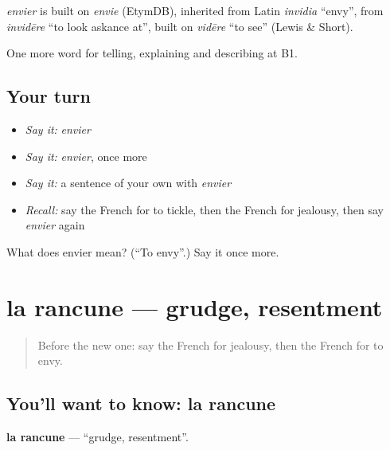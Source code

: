 \begin{cousinweb}
\emph{envier} is built on \emph{envie} (EtymDB), inherited from Latin \emph{invidia} \textquotedblleft{}envy\textquotedblright{}, from \emph{invidēre} \textquotedblleft{}to look askance at\textquotedblright{}, built on \emph{vidēre} \textquotedblleft{}to see\textquotedblright{} (Lewis \& Short).
\end{cousinweb}

\begin{grammarlens}[title={What you've built}]
One more word for telling, explaining and describing at B1.
\end{grammarlens}

\subsection*{Your turn}
\begin{itemize}
\raggedright
  \item \emph{Say it:} \emph{envier}
  \item \emph{Say it:} \emph{envier}, once more
  \item \emph{Say it:} a sentence of your own with \emph{envier}
  \item \emph{Recall:} say the French for to tickle, then the French for jealousy, then say \emph{envier} again
\end{itemize}

\begin{tcolorbox}[breakable,colback=teal!4,colframe=teal!35!black,title={Before you move on}]
What does envier mean? (\textquotedblleft{}To envy\textquotedblright{}.) Say it once more.
\end{tcolorbox}
\section[la rancune]{la rancune — grudge, resentment}

\label{lesson:FR-C475-rancune}



\begin{quote}
Before the new one: say the French for jealousy, then the French for to envy.
\end{quote}

\subsection*{You'll want to know: la rancune}
\textbf{la rancune} — \textquotedblleft{}grudge, resentment\textquotedblright{}.

